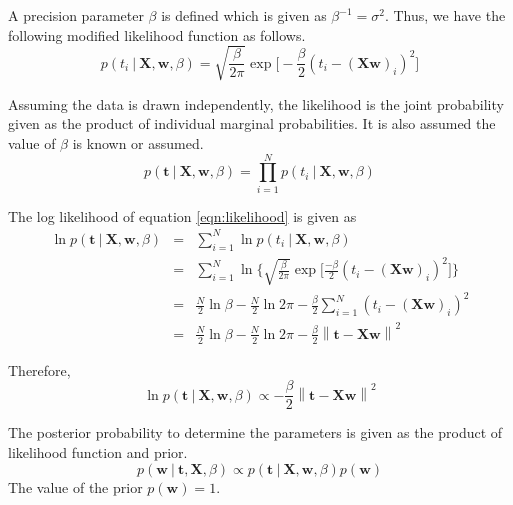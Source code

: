 \documentclass[11pt]{article}
\newcommand\given[1][]{\:#1\vert\:}
\newcommand{\norm}[1]{\left\lVert#1\right\rVert}
\begin{document}
A precision parameter $\beta$ is defined which is given as $\beta^{-1} = \sigma^2$. 
Thus, we have the following modified likelihood function as follows.
\begin{equation}
    p(t_i \given \bm{X}, \bm{w}, \beta) = \sqrt{\frac{\beta}{2\pi}}\exp{\Big[-\frac{\beta}{2} \left(t_i - (\bm{X}\bm{w})_i\right)^2\Big]}
\end{equation}

Assuming the data is drawn independently, the likelihood is the joint probability given as the product of individual marginal probabilities. It is also assumed the value of $\beta$ is known or assumed. 
\begin{equation}\label{eqn:likelihood}
    p(\bm{t} \given \bm{X}, \bm{w}, \beta) = \prod_{i=1}^N p(t_i \given \bm{X}, \bm{w}, \beta)
\end{equation}

The log likelihood of equation \ref{eqn:likelihood} is given as 
\begin{eqnarray} \label{eqn:log_likelihood}
    \ln p(\bm{t} \given \bm{X}, \bm{w}, \beta) 
    &=&
    \sum_{i=1}^N \ln p(t_i \given \bm{X}, \bm{w}, \beta) \\
    &=&
    \sum_{i=1}^N \ln{\Big\{\sqrt{\frac{\beta}{2\pi}}\exp{\Big[\frac{-\beta}{2} \left(t_i - (\bm{X}\bm{w})_i\right)^2\Big]}\Big\}} \\
    &=&
    \frac{N}{2}\ln{\beta} - \frac{N}{2}\ln{2\pi} - \frac{\beta}{2} \sum_{i=1}^N \left(t_i - (\bm{X}\bm{w})_i\right)^2 \\
    &=&
    \frac{N}{2}\ln{\beta} - \frac{N}{2}\ln{2\pi} - \frac{\beta}{2} \norm{\bm{t} - \bm{Xw}}^2 
\end{eqnarray}

Therefore,
\begin{equation}
    \ln p(\bm{t} \given \bm{X}, \bm{w}, \beta) \propto -\frac{\beta}{2} \norm{\bm{t} - \bm{Xw}}^2
\end{equation}

The posterior probability to determine the parameters is given as the product of likelihood function and prior.
\begin{equation} 
    p(\bm{w} \given \bm{t}, \bm{X}, \beta) \propto p(\bm{t} \given \bm{X}, \bm{w}, \beta) p(\bm{w})
\end{equation}
The value of the prior $p(\bm{w}) = 1$. 
\end{document}
